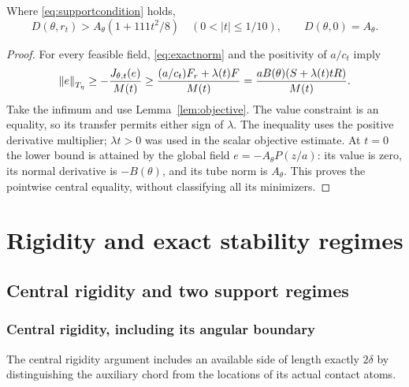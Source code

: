 \documentclass[11pt,a4paper]{article}
\begin{document}
\begin{corollary}\label{cor:pointlower}
Where \eqref{eq:supportcondition} holds,
\begin{equation}\label{eq:pointlower}
 D(\theta,r_t)>A_\theta(1+111t^2/8)
                  \quad(0<|t|\le1/10),\qquad
 D(\theta,0)=A_\theta.
\end{equation}
\end{corollary}
\begin{proof}
For every feasible field, \eqref{eq:exactnorm} and the positivity of
$a/c_t$ imply
\[
 \left\lVert e\right\rVert_{T_\eta}\ge-\frac{J_{\theta,t}(e)}{M(t)}
 \ge\frac{(a/c_t)F_r+\lambda(t)F}{M(t)}
 =\frac{aB(\theta)(S+\lambda(t)tR)}{M(t)}.
\]
Take the infimum and use Lemma~\ref{lem:objective}. The value
constraint is an equality, so its transfer permits either sign of
$\lambda$. The inequality uses the positive derivative multiplier;
$\lambda t>0$ was used in the scalar objective estimate. At
$t=0$ the lower bound is attained by the global field
$e=-A_\theta P(z/a)$: its value is zero, its normal derivative is
$-B(\theta)$, and its tube norm is $A_\theta$. This proves the
pointwise central equality, without classifying all its minimizers.
\end{proof}

\section{Rigidity and exact stability regimes}\label{sec:exact}

\subsection{Central rigidity and two support regimes}\label{sec:regimes}


\subsubsection{Central rigidity, including its angular boundary}\label{sec:centralrigidity}
The central rigidity argument includes an available side of length
exactly $2\delta$ by distinguishing
the auxiliary chord from the locations of its actual contact atoms.
\end{document}
